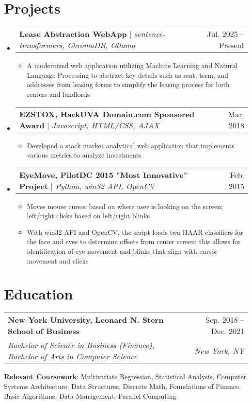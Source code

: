 \documentclass[letterpaper,11pt]{article}
\makeatletter
\newcommand{\resumeItem}[1]{
  \item\small{
    {#1 \vspace{-2pt}}
  }
}
\newcommand{\resumeSubheading}[4]{
  \vspace{-2pt}\item
    \begin{tabular*}{0.97\textwidth}[t]{l@{\extracolsep{\fill}}r}
      \textbf{#1} & #2 \\
      \textit{\small#3} & \textit{\small #4} \\
    \end{tabular*}\vspace{-7pt}
}
\newcommand{\resumeProjectHeading}[2]{
    \item
    \begin{tabular*}{0.97\textwidth}{l@{\extracolsep{\fill}}r}
      \small#1 & #2 \\
    \end{tabular*}\vspace{-7pt}
}
\newcommand{\resumeSubHeadingListStart}{\begin{itemize}[leftmargin=0.15in, label={}]}
\newcommand{\resumeSubHeadingListEnd}{\end{itemize}}
\newcommand{\resumeItemListStart}{\begin{itemize}}
\newcommand{\resumeItemListEnd}{\end{itemize}\vspace{-5pt}}
\makeatother
\begin{document}
\section{Projects}
    \resumeSubHeadingListStart
        \resumeProjectHeading
          {\textbf{Lease Abstraction WebApp} $|$ \emph{sentence-transformers, ChromaDB, Ollama}}
          {Jul. 2025 -- Present}
          \resumeItemListStart
            \resumeItem{A modernized web application utilizing Machine Learning and Natural Language Processing to abstract key details such as rent, term, and addresses from leasing forms to simplify the leasing process for both renters and landlords}
          \resumeItemListEnd
        \resumeProjectHeading
          {\textbf{EZSTOX, HackUVA Domain.com Sponsored Award} $|$ \emph{Javascript, HTML/CSS, AJAX}}{Mar. 2018}
          \resumeItemListStart
            \resumeItem{Developed a stock market analytical web application that implements various metrics to analyze investments}
          \resumeItemListEnd
        \resumeProjectHeading
          {\textbf{EyeMove, PilotDC 2015 "Most Innovative" Project} $|$ \emph{Python, win32 API, OpenCV}}{Feb. 2015}
          \resumeItemListStart
            \resumeItem{Moves mouse cursor based on where user is looking on the screen; left/right clicks based on left/right blinks}
            \resumeItem{With win32 API and OpenCV, the script loads two HAAR classifiers for the face and eyes to determine offsets from center screen; this allows for identification of eye movement and blinks that align with cursor movement and clicks}
          \resumeItemListEnd
    \resumeSubHeadingListEnd

\section{Education}
  \resumeSubHeadingListStart
    \resumeSubheading
      {New York University, Leonard N. Stern School of Business}{Sep. 2018 -- Dec. 2021}
      {Bachelor of Science in Business (Finance), Bachelor of Arts in Computer Science}{New York, NY}
    \small{\item{
        \textbf{Relevant Coursework}{: Multivariate Regression, Statistical Analysis, Computer Systems Architecture, Data Structures, Discrete Math, Foundations of Finance, Basic Algorithms, Data Management, Parallel Computing} \\
    }}
  \resumeSubHeadingListEnd

%
\end{document}
